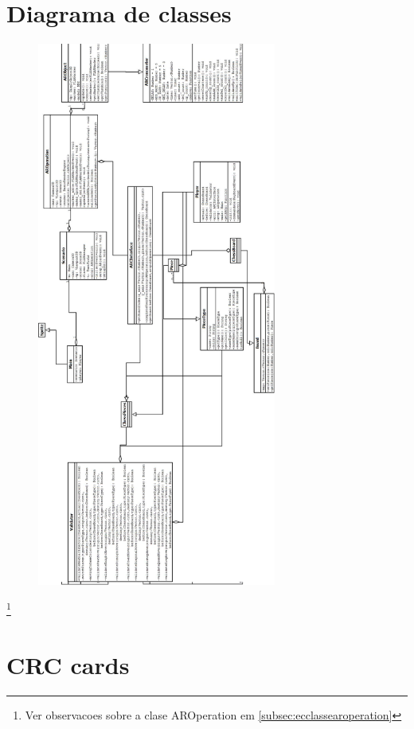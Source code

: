 \documentclass[a4paper,12pt]{book}
\begin{document}
	\chapter{Diagrama de classes}
	\label{ch:diagramadeclasses}
	\begin{figure}[H]
	\centering
	\includegraphics[width=0.7\textwidth, height=0.7\textheight]{diagramadeclasses}
	\end{figure}
	\footnote{Ver observacoes sobre a clase AROperation em
			  \ref{subsec:ecclassearoperation}
			 }

  \chapter{CRC cards}
  \label{ch:crccards}
\end{document}
